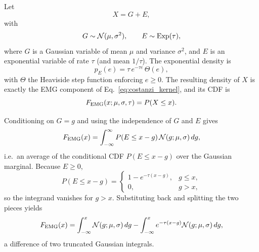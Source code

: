 \documentclass[a4paper, 11pt]{article}
\begin{document}
Let
\begin{equation}
X = G + E,
\label{eq:X_decomp}
\end{equation}
with
\begin{equation}
G \sim \mathcal N(\mu,\sigma^2),
\qquad
E \sim {\rm Exp}(\tau),
\end{equation}
where $G$ is a Gaussian variable of mean $\mu$ and variance $\sigma^2$, and $E$ is an exponential variable of rate $\tau$ (and mean $1/\tau$). The exponential density is
\[
p_E(e)=\tau\, e^{-\tau e}\,\Theta(e),
\]
with $\Theta$ the Heaviside step function enforcing $e\ge 0$. The resulting density of $X$ is exactly the EMG component of Eq.~\eqref{eq:costanzi_kernel}, and its CDF is
\begin{equation}
F_{\rm EMG}(x;\mu,\sigma,\tau)=P(X\le x).
\end{equation}

Conditioning on $G=g$ and using the independence of $G$ and $E$ gives
\begin{equation}
F_{\rm EMG}(x)
=
\int_{-\infty}^{\infty}
P(E\le x-g)\,
\mathcal N(g;\mu,\sigma)\,dg,
\end{equation}
i.e.\ an average of the conditional CDF $P(E\le x-g)$ over the Gaussian marginal. Because $E\ge 0$,
\begin{equation}
P(E\le x-g)=
\begin{cases}
1-e^{-\tau(x-g)}, & g\le x, \\
0, & g>x,
\end{cases}
\end{equation}
so the integrand vanishes for $g>x$. Substituting back and splitting the two pieces yields
\begin{equation}
F_{\rm EMG}(x)
=
\int_{-\infty}^{x}\mathcal N(g;\mu,\sigma)\,dg
-
\int_{-\infty}^{x} e^{-\tau(x-g)}\mathcal N(g;\mu,\sigma)\,dg,
\label{eq:exg_cdf_step1}
\end{equation}
a difference of two truncated Gaussian integrals.
\end{document}
